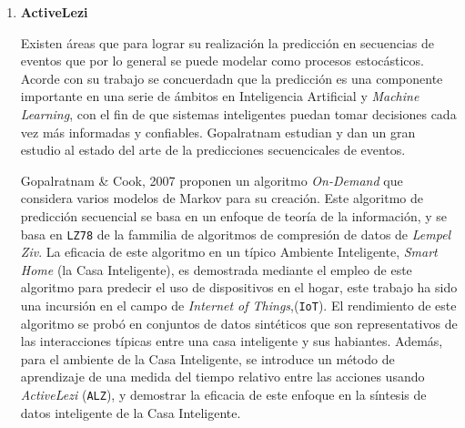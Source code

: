 \begin{enumerate}
{	%
	
	
	
	}
  \item \textbf{ActiveLezi} 
  {

  	  
Existen áreas que para lograr su realización la predicción en secuencias de eventos que por lo general se puede modelar como procesos estocásticos.
Acorde con su trabajo se concuerdadn que la predicción es una componente importante en una serie de ámbitos en Inteligencia Artificial y \emph{Machine Learning}, con el fin de que sistemas inteligentes puedan tomar decisiones cada vez más informadas y confiables.  Gopalratnam \etal\cite{Gopalratnam2007} estudian y dan un gran estudio al estado del arte de la predicciones secuencicales de eventos.

Gopalratnam \& Cook, 2007 \etal\cite{Gopalratnam2007} proponen un algoritmo \emph{On-Demand} que considera varios modelos de Markov para su creación.  Este algoritmo de predicción secuencial se basa en un enfoque de teoría de la información, y se basa en \texttt{LZ78} de la fammilia de algoritmos de compresión de datos de \emph{Lempel Ziv}. La eficacia de este algoritmo en un típico {Ambiente Inteligente}, \emph{Smart Home} (la Casa Inteligente), es demostrada mediante el empleo de este algoritmo para predecir el uso de dispositivos en el hogar, este trabajo ha sido una incursión en el campo de \emph{Internet of Things},(\texttt{IoT}). El rendimiento de este algoritmo se probó en conjuntos de datos sintéticos que son representativos de las interacciones típicas entre una casa inteligente y sus habiantes. Además, para el ambiente de la Casa Inteligente, se introduce un método de aprendizaje de una medida del tiempo relativo entre las acciones usando \emph{ActiveLezi} (\texttt{ALZ})\label{acro-ActiveLezi}, y demostrar la eficacia de este enfoque en la síntesis de datos inteligente de la Casa Inteligente.

}
\end{enumerate}
